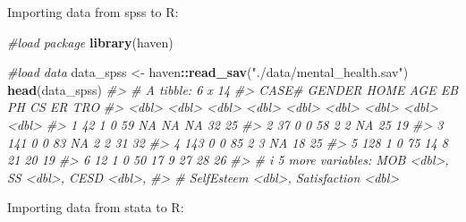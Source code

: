 \documentclass[
]{book}
\newenvironment{Shaded}{\begin{snugshade}}{\end{snugshade}}
\newcommand{\CommentTok}[1]{\textcolor[rgb]{0.56,0.35,0.01}{\textit{#1}}}
\newcommand{\FunctionTok}[1]{\textcolor[rgb]{0.13,0.29,0.53}{\textbf{#1}}}
\newcommand{\NormalTok}[1]{#1}
\newcommand{\OtherTok}[1]{\textcolor[rgb]{0.56,0.35,0.01}{#1}}
\newcommand{\SpecialCharTok}[1]{\textcolor[rgb]{0.81,0.36,0.00}{\textbf{#1}}}
\newcommand{\StringTok}[1]{\textcolor[rgb]{0.31,0.60,0.02}{#1}}
\begin{document}
Importing data from spss to R:

\begin{Shaded}
\begin{Highlighting}[]
\CommentTok{\#load package}
\FunctionTok{library}\NormalTok{(haven)}

\CommentTok{\#load data}
\NormalTok{data\_spss }\OtherTok{\textless{}{-}}\NormalTok{ haven}\SpecialCharTok{::}\FunctionTok{read\_sav}\NormalTok{(}\StringTok{"./data/mental\_health.sav"}\NormalTok{)}
\FunctionTok{head}\NormalTok{(data\_spss)}
\CommentTok{\#\textgreater{} \# A tibble: 6 x 14}
\CommentTok{\#\textgreater{}   \textasciigrave{}CASE\#\textasciigrave{} GENDER  HOME   AGE    EB    PH    CS    ER   TRO}
\CommentTok{\#\textgreater{}     \textless{}dbl\textgreater{}  \textless{}dbl\textgreater{} \textless{}dbl\textgreater{} \textless{}dbl\textgreater{} \textless{}dbl\textgreater{} \textless{}dbl\textgreater{} \textless{}dbl\textgreater{} \textless{}dbl\textgreater{} \textless{}dbl\textgreater{}}
\CommentTok{\#\textgreater{} 1      42      1     0    59    NA    NA    NA    32    25}
\CommentTok{\#\textgreater{} 2      37      0     0    58     2     2    NA    25    19}
\CommentTok{\#\textgreater{} 3     141      0     0    83    NA     2     2    31    32}
\CommentTok{\#\textgreater{} 4     143      0     0    85     2     3    NA    18    25}
\CommentTok{\#\textgreater{} 5     128      1     0    75    14     8    21    20    19}
\CommentTok{\#\textgreater{} 6      12      1     0    50    17     9    27    28    26}
\CommentTok{\#\textgreater{} \# i 5 more variables: MOB \textless{}dbl\textgreater{}, SS \textless{}dbl\textgreater{}, CESD \textless{}dbl\textgreater{},}
\CommentTok{\#\textgreater{} \#   SelfEsteem \textless{}dbl\textgreater{}, Satisfaction \textless{}dbl\textgreater{}}
\end{Highlighting}
\end{Shaded}

Importing data from stata to R:
\end{document}
